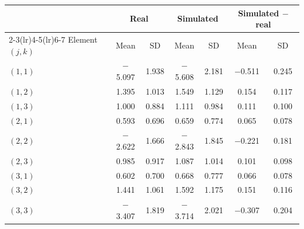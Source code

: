 \begin{tabular}{lcccccc}
\toprule
 & \multicolumn{2}{c}{Real} & \multicolumn{2}{c}{Simulated} & \multicolumn{2}{c}{Simulated $-$ real} \\
\cmidrule(lr){2-3}\cmidrule(lr){4-5}\cmidrule(lr){6-7}
Element $(j,k)$ & Mean & SD & Mean & SD & Mean & SD \\
\midrule
$(1,1)$ & $-$5.097 & 1.938 & $-$5.608 & 2.181 & $-$0.511 & 0.245 \\
$(1,2)$ & 1.395 & 1.013 & 1.549 & 1.129 & 0.154 & 0.117 \\
$(1,3)$ & 1.000 & 0.884 & 1.111 & 0.984 & 0.111 & 0.100 \\
$(2,1)$ & 0.593 & 0.696 & 0.659 & 0.774 & 0.065 & 0.078 \\
$(2,2)$ & $-$2.622 & 1.666 & $-$2.843 & 1.845 & $-$0.221 & 0.181 \\
$(2,3)$ & 0.985 & 0.917 & 1.087 & 1.014 & 0.101 & 0.098 \\
$(3,1)$ & 0.602 & 0.700 & 0.668 & 0.777 & 0.066 & 0.078 \\
$(3,2)$ & 1.441 & 1.061 & 1.592 & 1.175 & 0.151 & 0.116 \\
$(3,3)$ & $-$3.407 & 1.819 & $-$3.714 & 2.021 & $-$0.307 & 0.204 \\
\bottomrule
\end{tabular}
